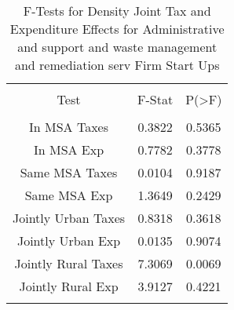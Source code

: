 
\begin{table}[!htbp] \centering 
  \caption{F-Tests for Density Joint Tax and Expenditure Effects for Administrative and support and waste management and remediation serv Firm Start Ups} 
  \label{56Ftests} 
\begin{tabular}{@{\extracolsep{5pt}} ccc} 
\\[-1.8ex]\hline 
\hline \\[-1.8ex] 
Test & F-Stat & P(\textgreater F) \\ 
\hline \\[-1.8ex] 
In MSA Taxes & 0.3822 & 0.5365 \\ 
In MSA Exp & 0.7782 & 0.3778 \\ 
Same MSA Taxes & 0.0104 & 0.9187 \\ 
Same MSA Exp & 1.3649 & 0.2429 \\ 
Jointly Urban Taxes & 0.8318 & 0.3618 \\ 
Jointly Urban Exp & 0.0135 & 0.9074 \\ 
Jointly Rural Taxes & 7.3069 & 0.0069 \\ 
Jointly Rural Exp & 3.9127 & 0.4221 \\ 
\hline \\[-1.8ex] 
\end{tabular} 
\end{table} 
